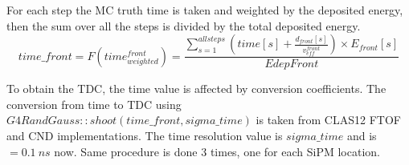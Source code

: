 	For each step the MC truth time is taken and weighted by the deposited energy, then the sum over all the steps is divided by the total deposited energy. \\
	\begin{equation}
	time\_front = F (time_{weighted}^{front}) = \frac{\sum_{s=1}^{all steps} (time[s] + \frac{d_{front}[s]}{v_{eff}^{front}}) \times E_{front}[s]}{EdepFront}
	\end{equation}
	
	To obtain the TDC, the time value is affected by conversion coefficients. The conversion from time to TDC using $G4RandGauss::shoot(time\_front, sigma\_time)$ is taken from CLAS12 FTOF and CND implementations. The time resolution value is $sigma\_time$ and is $ = 0.1 \ ns$ now.
	Same procedure is done 3 times, one for each SiPM location.
	
